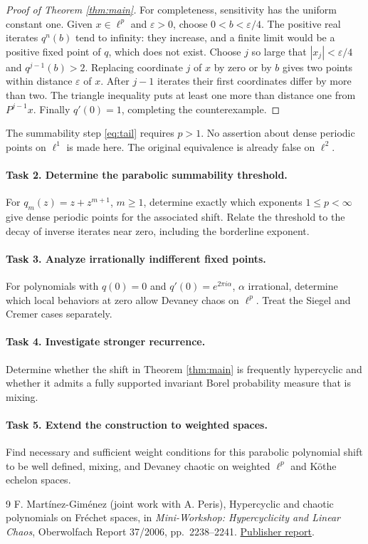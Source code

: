 \documentclass[11pt]{article}
\begin{document}
\begin{proof}[Proof of Theorem \ref{thm:main}]
For completeness, sensitivity has the uniform constant one. Given
\(x\in\ell^p\) and \(\varepsilon>0\), choose \(0<b<\varepsilon/4\).
The positive real iterates \(q^n(b)\) tend to infinity: they increase,
and a finite limit would be a positive fixed point of \(q\), which
does not exist. Choose \(j\) so large that \(|x_j|<\varepsilon/4\) and
\(q^{j-1}(b)>2\). Replacing coordinate \(j\) of \(x\) by zero or by \(b\)
gives two points within distance \(\varepsilon\) of \(x\).
After \(j-1\) iterates their first coordinates differ by more than two.
The triangle inequality puts at least one more than distance one from
\(P^{j-1}x\). Finally \(q'(0)=1\), completing the counterexample.
\end{proof}

The summability step \eqref{eq:tail} requires \(p>1\). No assertion about
dense periodic points on \(\ell^1\) is made here. The original equivalence
is already false on \(\ell^2\).

\paragraph{Task 2. Determine the parabolic summability threshold.}
For \(q_m(z)=z+z^{m+1}\), \(m\ge1\), determine exactly which exponents
\(1\le p<\infty\) give dense periodic points for the associated shift.
Relate the threshold to the decay of inverse iterates near zero,
including the borderline exponent.

\paragraph{Task 3. Analyze irrationally indifferent fixed points.}
For polynomials with \(q(0)=0\) and \(q'(0)=e^{2\pi i\alpha}\),
\(\alpha\) irrational, determine which local behaviors at zero allow
Devaney chaos on \(\ell^p\). Treat the Siegel and Cremer cases separately.

\paragraph{Task 4. Investigate stronger recurrence.}
Determine whether the shift in Theorem \ref{thm:main} is frequently
hypercyclic and whether it admits a fully supported invariant Borel
probability measure that is mixing.

\paragraph{Task 5. Extend the construction to weighted spaces.}
Find necessary and sufficient weight conditions for this parabolic
polynomial shift to be well defined, mixing, and Devaney chaotic on
weighted \(\ell^p\) and K\"othe echelon spaces.

\begin{thebibliography}{9}
F. Mart\'inez-Gim\'enez (joint work with A. Peris),
Hypercyclic and chaotic polynomials on Fr\'echet spaces,
in \emph{Mini-Workshop: Hypercyclicity and Linear Chaos},
Oberwolfach Report 37/2006, pp.~2238--2241.
\href{https://ems.press/journals/owr/articles/1323}{Publisher report}.
\end{thebibliography}
\end{document}
